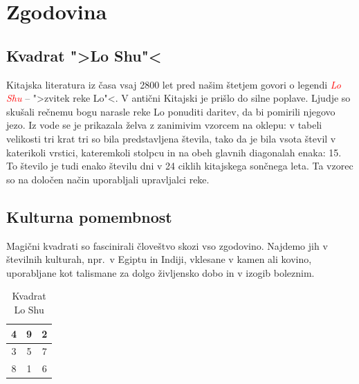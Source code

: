 \documentclass[a4paper,12pt]{article}
\begin{document}

\section{Zgodovina}

\subsection{Kvadrat ">Lo Shu"<}

Kitajska literatura iz časa vsaj 2800 let pred našim štetjem govori o legendi
\textcolor{red}{\emph{Lo Shu}} -- ">zvitek reke Lo"<. V antični Kitajski je prišlo do
silne poplave. Ljudje so skušali rečnemu bogu narasle reke Lo ponuditi daritev,
da bi pomirili njegovo jezo. Iz vode se je prikazala želva z zanimivim vzorcem
na oklepu: v tabeli velikosti tri krat tri so bila predstavljena števila, tako
da je bila vsota števil v katerikoli vrstici, kateremkoli stolpcu in na obeh
glavnih diagonalah enaka: 15. To število je tudi enako številu dni v 24 ciklih
kitajskega sončnega leta. Ta vzorec so na določen način uporabljali upravljalci
reke.


\subsection{Kulturna pomembnost}

Magični kvadrati so fascinirali človeštvo skozi vso zgodovino. Najdemo jih
v številnih kulturah, npr.\ v Egiptu in Indiji, vklesane v kamen ali
kovino, uporabljane kot talismane za dolgo življensko dobo in v
izogib boleznim.


\begin{table}[h]
   \begin{center}

   \caption{Kvadrat Lo Shu}
   \label{table:mag3}
   \begin{tabular}{|c|c|c|}
   \hline
   4 & 9 & 2 \\ \hline
   3 & 5 & 7 \\ \hline
   8 & 1 & 6 \\ \hline
   \end{tabular}
         
   \end{center}
\end{table}
\end{document}
